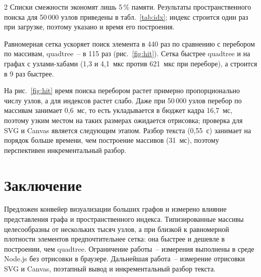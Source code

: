 \documentclass[a4paper,10pt,twoside]{article}
\begin{document}
\begin{multicols}{2}
Списки смежности экономят лишь 5\,\% памяти. Результаты пространственного поиска для 50\,000 узлов приведены в табл.~\ref{tab:idx}; индекс строится один раз при загрузке, поэтому указано и время его построения.


Равномерная сетка ускоряет поиск элемента в 440 раз по сравнению с перебором по массивам, quadtree~-- в 115 раз (рис.~\ref{fig:hit}). Сетка быстрее quadtree и на графах с узлами-хабами (1,3 и 4,1~мкс против 621~мкс при переборе), а строится в 9 раз быстрее.


На рис.~\ref{fig:hit} время поиска перебором растет примерно пропорционально числу узлов, а для индексов растет слабо. Даже при 50\,000 узлов перебор по массивам занимает 0,6~мс, то есть укладывается в бюджет кадра 16,7~мс, поэтому узким местом на таких размерах ожидается отрисовка; проверка для SVG и Canvas является следующим этапом. Разбор текста (0,55~с) занимает на порядок больше времени, чем построение массивов (31~мс), поэтому перспективен инкрементальный разбор.

\section*{Заключение}
Предложен конвейер визуализации больших графов и измерено влияние представления графа и пространственного индекса. Типизированные массивы целесообразны от нескольких тысяч узлов, а при близкой к равномерной плотности элементов предпочтительнее сетка: она быстрее и дешевле в построении, чем quadtree. Ограничение работы~-- измерения выполнены в среде Node.js без отрисовки в браузере. Дальнейшая работа~-- измерение отрисовки SVG и Canvas, поэтапный вывод и инкрементальный разбор текста.


\end{multicols}
\end{document}
